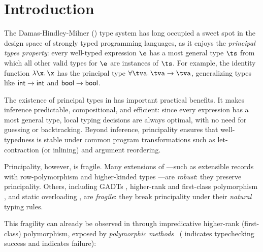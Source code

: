 \documentclass[acmsmall,screen,nonacm%
\Anonymous{,anonymous}{}%
\Final{}{,review}%
]{acmart}
\newcommand{\BBpolyml}{Garrigue-Remy/poly-ml}
\begin{document}
\section{Introduction}
\label{sec/introduction}


The Damas-Hindley-Milner (\ML) \citep*{Damas-Milner/W@popl82,
hindley1969principal} type system has long occupied a sweet spot in the design
space of strongly typed programming languages, as it enjoys the \emph{principal
types property}: every well-typed expression $\e$ has a most general type $\ts$
from which all other valid types for $\e$ are instances of $\ts$. For example,
the identity function $\efun \x \x$ has the principal type $\tfor \tv \tv \to
\tv$, generalizing types like $\mathsf{int} \to \mathsf{int}$ and $\mathsf{bool} \to \mathsf{bool}$.


The existence of principal types in \ML has important practical benefits. It
makes inference predictable, compositional, and efficient: since every
expression has a most general type, local typing decisions are always optimal,
with no need for guessing or backtracking. Beyond inference, principality
ensures that well-typedness is stable under common program transformations such
as let-contraction (or inlining) and argument reordering.


Principality, however, is fragile. Many extensions of \ML---such as extensible
records with row-polymorphism \citep*{Remy/popl89, conf/popl/RemyV97,
conf/lics/Wand89, journals/toplas/Ohori95, garrigue1998programming} and
higher-kinded types \citep*{journals/jfp/Jones95}---are \emph{robust}: they
preserve principality. Others, including GADTs
\citep*{conf/icfp/SchrijversJSV09, conf/aplas/GarrigueR13}, higher-rank and
first-class polymorphism \citep*{conf/popl/OderskyL96,
\BBpolyml, journals/pacmpl/SerranoHJV20}, and static overloading
\citep*{Chargueraud-Bodin-Dunfield-Riboulet/jfla2025}, are \emph{fragile}: they
break principality under their \emph{natural} typing rules.


This fragility can already be observed in \OCaml through impredicative
higher-rank (\ie first-class) polymorphism, exposed by \emph{polymorphic
methods}~\citep{\BBpolyml} ( indicates
typechecking success and  indicates
failure):
\end{document}
